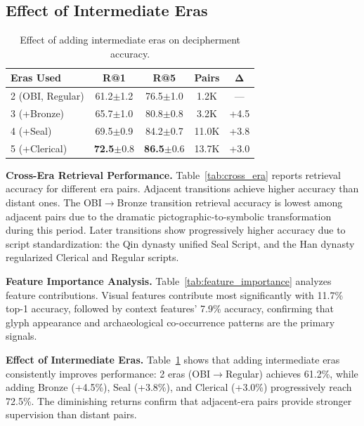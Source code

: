 \documentclass{article}
\begin{document}
\subsection{Effect of Intermediate Eras}
\label{app:num_eras}

\begin{table}[h]
\centering
\small
\caption{Effect of adding intermediate eras on decipherment accuracy.}
\label{tab:num_eras}
\begin{tabular}{lcccc}
\toprule
\textbf{Eras Used} & \textbf{R@1} & \textbf{R@5} & \textbf{Pairs} & $\boldsymbol{\Delta}$ \\
\midrule
2 (OBI, Regular) & 61.2{\scriptsize$\pm$1.2} & 76.5{\scriptsize$\pm$1.0} & 1.2K & --- \\
3 (+Bronze) & 65.7{\scriptsize$\pm$1.0} & 80.8{\scriptsize$\pm$0.8} & 3.2K & +4.5 \\
4 (+Seal) & 69.5{\scriptsize$\pm$0.9} & 84.2{\scriptsize$\pm$0.7} & 11.0K & +3.8 \\
\rowcolor{gray!10}
5 (+Clerical) & \textbf{72.5}{\scriptsize$\pm$0.8} & \textbf{86.5}{\scriptsize$\pm$0.6} & 13.7K & +3.0 \\
\bottomrule
\end{tabular}
\end{table}

\textbf{Cross-Era Retrieval Performance.}
Table~\ref{tab:cross_era} reports retrieval accuracy for different era pairs. Adjacent transitions achieve higher accuracy than distant ones. The OBI$\to$Bronze transition retrieval accuracy is lowest among adjacent pairs due to the dramatic pictographic-to-symbolic transformation during this period. Later transitions show progressively higher accuracy due to script standardization: the Qin dynasty unified Seal Script, and the Han dynasty regularized Clerical and Regular scripts.


\textbf{Feature Importance Analysis.}
Table~\ref{tab:feature_importance} analyzes feature contributions. Visual features contribute most significantly with 11.7\% top-1 accuracy, followed by context features' 7.9\% accuracy, confirming that glyph appearance and archaeological co-occurrence patterns are the primary signals.


\textbf{Effect of Intermediate Eras.}
Table~\ref{tab:num_eras} shows that adding intermediate eras consistently improves performance: 2 eras (OBI$\to$Regular) achieves 61.2\%, while adding Bronze (+4.5\%), Seal (+3.8\%), and Clerical (+3.0\%) progressively reach 72.5\%. The diminishing returns confirm that adjacent-era pairs provide stronger supervision than distant pairs.
\end{document}
